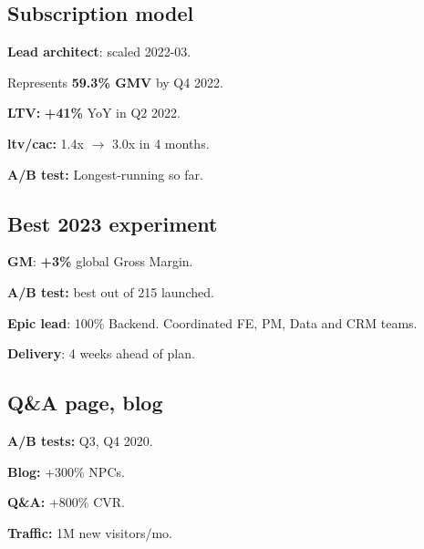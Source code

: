 \documentclass[a4paper]{MagicalCV}
\begin{document}
\lastupdated


\begin{minipage}[t]{0.33\textwidth}

\sectionsep
\subsection{Subscription model}
\begin{tightemize}
\item {\bf Lead architect}: scaled 2022-03.
\item Represents {\bf 59.3\% GMV} by Q4 2022.
\item {\bf LTV: } {\bf +41\% } YoY in Q2 2022.
\item {\bf ltv/cac: } 1.4x $\rightarrow$ 3.0x in 4 months.
\item {\bf A/B test: } Longest-running so far.
\end{tightemize}
\sectionsep

\subsection{Best 2023 experiment}
\begin{tightemize}
\item {\bf GM}: {\bf +3\% } global Gross Margin.
\item {\bf A/B test:} best out of 215 launched.
\item {\bf Epic lead}: 100\% Backend. Coordinated FE, PM, Data and CRM teams.
\item {\bf Delivery}: 4 weeks ahead of plan.

\end{tightemize}
\sectionsep

\subsection{Q\&A page, blog}
\begin{tightemize}
\item {\bf A/B tests: } Q3, Q4 2020.
\item {\bf Blog: } +300\% NPCs.
\item {\bf Q\&A: } +800\% CVR.
\item {\bf Traffic: } 1M new visitors/mo.
\end{tightemize}
\sectionsep


\end{minipage}
\end{document}
